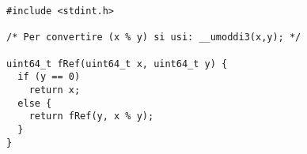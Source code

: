 
\begin{verbatim}
#include <stdint.h>

/* Per convertire (x % y) si usi: __umoddi3(x,y); */

uint64_t fRef(uint64_t x, uint64_t y) {
  if (y == 0)
    return x;
  else {
    return fRef(y, x % y);
  }
}

\end{verbatim}